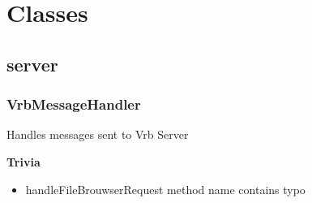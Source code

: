 
\renewcommand{\namespace}{kernel::vrb::}

\section{Classes}

\subsection{server}
\subsubsection{VrbMessageHandler}

Handles messages sent to Vrb Server

\textbf{Trivia}
\begin{itemize}
	\item handleFileBrouwserRequest method name contains typo
\end{itemize}